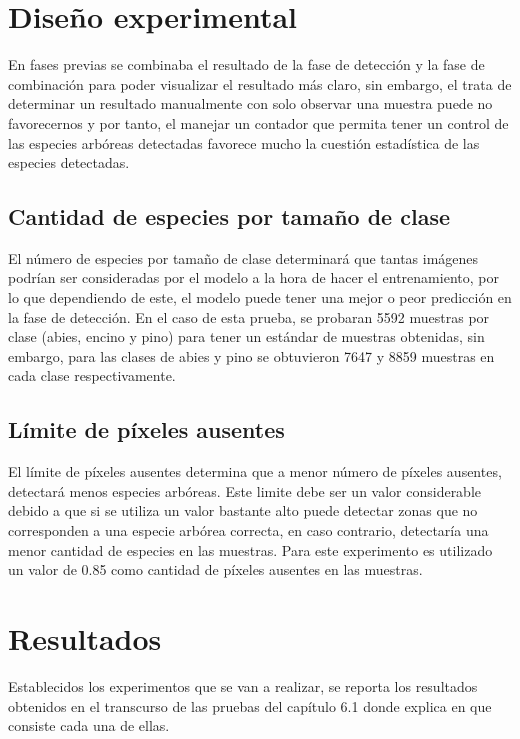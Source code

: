 \section{Diseño experimental}
En fases previas se combinaba el resultado de la fase de detección y la fase de combinación para poder visualizar el resultado más claro, sin embargo, el trata de determinar un resultado manualmente con solo observar una muestra puede no favorecernos y por tanto, el manejar un contador que permita tener un control de las especies arbóreas detectadas favorece mucho la cuestión estadística de las especies detectadas.

\subsection{Cantidad de especies por tamaño de clase}
El número de especies por tamaño de clase determinará que tantas imágenes podrían ser consideradas por el modelo a la hora de hacer el entrenamiento, por lo que dependiendo de este, el modelo puede tener una mejor o peor predicción en la fase de detección. En el caso de esta prueba, se probaran 5592 muestras por clase (abies, encino y pino) para tener un estándar de muestras obtenidas, sin embargo, para las clases de abies y pino se obtuvieron 7647 y 8859 muestras en cada clase respectivamente.

\subsection{Límite de píxeles ausentes}
El límite de píxeles ausentes determina que a menor número de píxeles ausentes, detectará menos especies arbóreas. Este limite debe ser un valor considerable debido a que si se utiliza un valor bastante alto puede detectar zonas que no corresponden a una especie arbórea correcta,  en caso contrario, detectaría una menor cantidad de especies en las muestras. Para este experimento es utilizado un valor de 0.85 como cantidad de píxeles ausentes en las muestras.
\section{Resultados}
Establecidos los experimentos que se van a realizar, se reporta los resultados obtenidos en el transcurso de las pruebas del capítulo 6.1 donde explica en que consiste cada una de ellas.

